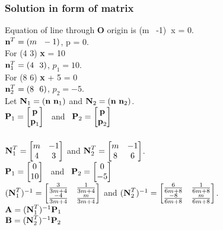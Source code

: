 \documentclass{beamer}
\begin{document}
\begin{frame}
\frametitle{Solution in form of matrix}
Equation of line through \textbf O origin is (m \ -1)\textbf \ x = 0.\\
$\textbf n^T = (m \ \ -1)$, p = 0.
\\For (4 3) \textbf x = 10\\
$\textbf n^T_1 = (4 \ \ 3)$, $p_1 = 10$.
\\For (8 6) \textbf x + 5 = 0\\
$\textbf n^T_2 = (8 \ \ 6)$, $p_2 = -5$.
\\Let $\textbf N_1 = (\textbf n \ \textbf n_1)$ and $\textbf N_2 = (\textbf n \ \textbf n_2)$.
\\$\textbf P_1 = \begin{bmatrix}
\textbf p\\\textbf p_1
\end{bmatrix}$ \ and \ $\textbf P_2 = \begin{bmatrix}
\textbf p\\\textbf p_2
\end{bmatrix}$
\end{frame}

\begin{frame}
\frametitle{}
 $\textbf N^T_1 = \begin{bmatrix}
 m & -1 \\ 4 & 3 \end{bmatrix}$ and $\textbf N^T_2 = \begin{bmatrix}
 m & -1 \\ 8 & 6 \end{bmatrix}$.\\
$\textbf P_1 = \begin{bmatrix}
0 \\ 10
\end{bmatrix}$ \ and \ $\textbf P_2 = \begin{bmatrix}
0 \\ -5
\end{bmatrix}$\\
 $ (\textbf N^T_1)^{-1} = \begin{bmatrix}
 \frac{3}{3m+4} & \frac{1}{3m+4} \\ \frac{-4}{3m+4} & \frac{m}{3m+4} \end{bmatrix}$ and $ (\textbf N^T_2)^{-1} = \begin{bmatrix}
 \frac{6}{6m+8} & \frac{1}{6m+8} \\ \frac{-8}{6m+8} & \frac{m}{6m+8} \end{bmatrix}$.\\
 $\textbf A = (\textbf N^T_1)^{-1} \textbf P_1$\\
 $\textbf B = (\textbf N^T_2)^{-1} \textbf P_2$
\end{frame}
\end{document}
